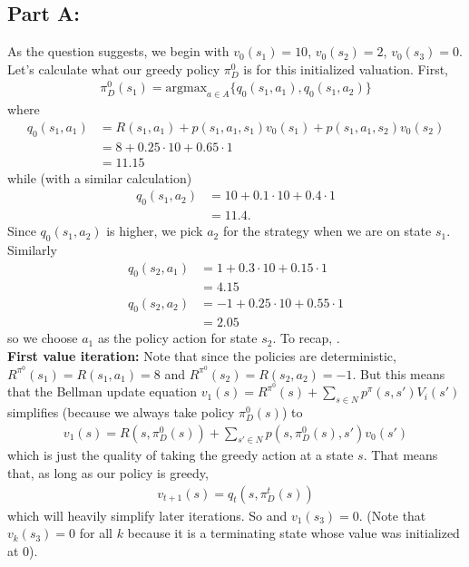 \documentclass{article}
\begin{document}
\subsection*{Part A:}
As the question suggests, we begin with $v_0(s_1) = 10$, $v_0(s_2) = 2$, $v_0(s_3) = 0$. Let's calculate what our greedy policy $\pi_D^0$ is for this initialized valuation. First, 
\begin{align*}
	\pi_D^0(s_1) = \text{argmax}_{a \in A} \{q_0(s_1, a_1), q_0(s_1, a_2)\}
\end{align*}
where
\begin{align*}
	q_0(s_1, a_1) &= R(s_1, a_1) + p(s_1, a_1, s_1)v_0(s_1) + p(s_1, a_1, s_2)v_0(s_2)\\
	&= 8 + 0.25\cdot 10 + 0.65 \cdot 1\\
	&= 11.15
\end{align*}
while (with a similar calculation)
\begin{align*}
	q_0(s_1, a_2) &= 10 + 0.1\cdot 10 + 0.4\cdot 1\\
	&= 11.4.
\end{align*}
Since $q_0(s_1, a_2)$ is higher, we pick $a_2$ for the strategy when we are on state $s_1$. Similarly
\begin{align*}
	q_0(s_2, a_1) &= 1 + 0.3\cdot 10 + 0.15 \cdot 1\\
	&= 4.15\\
	q_0(s_2, a_2) &= -1 + 0.25\cdot 10 + 0.55\cdot 1\\
	&= 2.05
\end{align*}
so we choose $a_1$ as the policy action for state $s_2$. To recap, .\\

\textbf{First value iteration:} Note that since the policies are deterministic, $R^{\pi^0}(s_1) = R(s_1, a_1) = 8$ and $R^{\pi^0}(s_2) = R(s_2, a_2) = -1$. But this means that the Bellman update equation $v_1(s) = R^{\pi^0}(s) + \sum_{s \in N}p^\pi(s, s')V_i(s')$ simplifies (because we always take policy $\pi_D^0(s)$) to
\begin{align*}
	v_1(s) = R(s, \pi_D^0(s)) + \sum_{s'\in N}p(s, \pi_D^0(s), s')v_0(s')
\end{align*}
which is just the quality of taking the greedy action at a state $s$. That means that, as long as our policy is greedy,
\begin{align*}
	v_{t + 1}(s) = q_t(s, \pi_D^t(s))
\end{align*}
which will heavily simplify later iterations. So  and $v_1(s_3) = 0$. (Note that $v_k(s_3) = 0$ for all $k$ because it is a terminating state whose value was initialized at 0).\\
\end{document}
